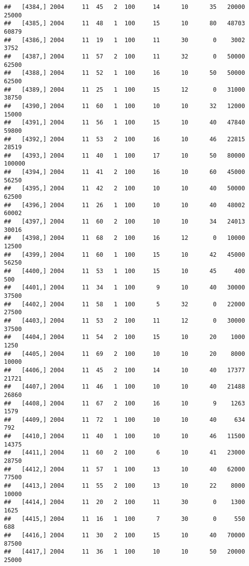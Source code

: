 \documentclass{article}\usepackage[]{graphicx}\usepackage[]{color}
\makeatletter
\newenvironment{kframe}{%
 \def\at@end@of@kframe{}%
 \ifinner\ifhmode%
  \def\at@end@of@kframe{\end{minipage}}%
  \begin{minipage}{\columnwidth}%
 \fi\fi%
 \def\FrameCommand##1{\hskip\@totalleftmargin \hskip-\fboxsep
 \colorbox{shadecolor}{##1}\hskip-\fboxsep
     \hskip-\linewidth \hskip-\@totalleftmargin \hskip\columnwidth}%
 \MakeFramed {\advance\hsize-\width
   \@totalleftmargin\z@ \linewidth\hsize
   \@setminipage}}%
 {\par\unskip\endMakeFramed%
 \at@end@of@kframe}
\newenvironment{knitrout}{}{} %
\makeatother
\begin{document}
\begin{knitrout}
\begin{kframe}
\begin{verbatim}
##   [4384,] 2004     11  45   2  100     14      10      35   20000   25000
##   [4385,] 2004     11  48   1  100     15      10      80   48703   60879
##   [4386,] 2004     11  19   1  100     11      30       0    3002    3752
##   [4387,] 2004     11  57   2  100     11      32       0   50000   62500
##   [4388,] 2004     11  52   1  100     16      10      50   50000   62500
##   [4389,] 2004     11  25   1  100     15      12       0   31000   38750
##   [4390,] 2004     11  60   1  100     10      10      32   12000   15000
##   [4391,] 2004     11  56   1  100     15      10      40   47840   59800
##   [4392,] 2004     11  53   2  100     16      10      46   22815   28519
##   [4393,] 2004     11  40   1  100     17      10      50   80000  100000
##   [4394,] 2004     11  41   2  100     16      10      60   45000   56250
##   [4395,] 2004     11  42   2  100     10      10      40   50000   62500
##   [4396,] 2004     11  26   1  100     10      10      40   48002   60002
##   [4397,] 2004     11  60   2  100     10      10      34   24013   30016
##   [4398,] 2004     11  68   2  100     16      12       0   10000   12500
##   [4399,] 2004     11  60   1  100     15      10      42   45000   56250
##   [4400,] 2004     11  53   1  100     15      10      45     400     500
##   [4401,] 2004     11  34   1  100      9      10      40   30000   37500
##   [4402,] 2004     11  58   1  100      5      32       0   22000   27500
##   [4403,] 2004     11  53   2  100     11      12       0   30000   37500
##   [4404,] 2004     11  54   2  100     15      10      20    1000    1250
##   [4405,] 2004     11  69   2  100     10      10      20    8000   10000
##   [4406,] 2004     11  45   2  100     14      10      40   17377   21721
##   [4407,] 2004     11  46   1  100     10      10      40   21488   26860
##   [4408,] 2004     11  67   2  100     16      10       9    1263    1579
##   [4409,] 2004     11  72   1  100     10      10      40     634     792
##   [4410,] 2004     11  40   1  100     10      10      46   11500   14375
##   [4411,] 2004     11  60   2  100      6      10      41   23000   28750
##   [4412,] 2004     11  57   1  100     13      10      40   62000   77500
##   [4413,] 2004     11  55   2  100     13      10      22    8000   10000
##   [4414,] 2004     11  20   2  100     11      30       0    1300    1625
##   [4415,] 2004     11  16   1  100      7      30       0     550     688
##   [4416,] 2004     11  30   2  100     15      10      40   70000   87500
##   [4417,] 2004     11  36   1  100     10      10      50   20000   25000

\end{verbatim}
\end{kframe}
\end{knitrout}
\end{document}
